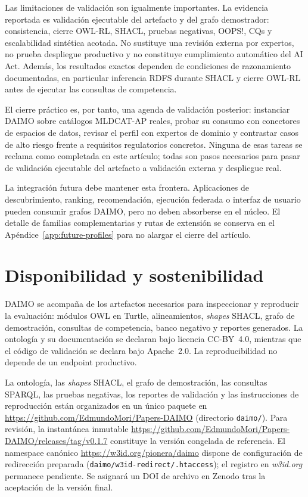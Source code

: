 \documentclass[Afour,sagev,times]{sagej}
\newcommand{\code}[1]{\texttt{#1}}
\begin{document}
Las limitaciones de validación son igualmente importantes. La evidencia reportada es validación ejecutable del artefacto y del grafo demostrador: consistencia, cierre OWL-RL, SHACL, pruebas negativas, OOPS!, CQs y escalabilidad sintética acotada. No sustituye una revisión externa por expertos, no prueba despliegue productivo y no constituye cumplimiento automático del AI Act. Además, los resultados exactos dependen de condiciones de razonamiento documentadas, en particular inferencia RDFS durante SHACL y cierre OWL-RL antes de ejecutar las consultas de competencia.

El cierre práctico es, por tanto, una agenda de validación posterior: instanciar DAIMO sobre catálogos MLDCAT-AP reales, probar su consumo con conectores de espacios de datos, revisar el perfil con expertos de dominio y contrastar casos de alto riesgo frente a requisitos regulatorios concretos. Ninguna de esas tareas se reclama como completada en este artículo; todas son pasos necesarios para pasar de validación ejecutable del artefacto a validación externa y despliegue real.

La integración futura debe mantener esta frontera. Aplicaciones de descubrimiento, ranking, recomendación, ejecución federada o interfaz de usuario pueden consumir grafos DAIMO, pero no deben absorberse en el núcleo. El detalle de familias complementarias y rutas de extensión se conserva en el Apéndice~\ref{app:future-profiles} para no alargar el cierre del artículo.

\section{Disponibilidad y sostenibilidad}\label{sec:avail}

DAIMO se acompaña de los artefactos necesarios para inspeccionar y reproducir la evaluación: módulos OWL en Turtle, alineamientos, \emph{shapes} SHACL, grafo de demostración, consultas de competencia, banco negativo y reportes generados. La ontología y su documentación se declaran bajo licencia CC-BY~4.0, mientras que el código de validación se declara bajo Apache~2.0. La reproducibilidad no depende de un endpoint productivo.

La ontología, las \emph{shapes} SHACL, el grafo de demostración, las consultas SPARQL, las pruebas negativas, los reportes de validación y las instrucciones de reproducción están organizados en un único paquete en \url{https://github.com/EdmundoMori/Papers-DAIMO} (directorio \code{daimo/}). Para revisión, la instantánea inmutable \url{https://github.com/EdmundoMori/Papers-DAIMO/releases/tag/v0.1.7} constituye la versión congelada de referencia. El namespace canónico \url{https://w3id.org/pionera/daimo} dispone de configuración de redirección preparada (\code{daimo/w3id-redirect/.htaccess}); el registro en \emph{w3id.org} permanece pendiente. Se asignará un DOI de archivo en Zenodo tras la aceptación de la versión final.
\end{document}
